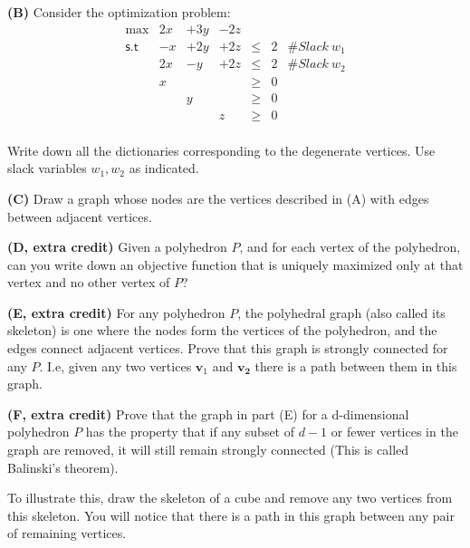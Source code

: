 \documentclass[11pt]{article}
\begin{document}
\noindent\textbf{(B)} Consider the optimization problem:
\[ \begin{array}{rcccccc}
\max & 2x & + 3y & - 2z \\
\mathsf{s.t} &  -x & + 2 y & + 2z & \leq & 2 & \# Slack\ w_1\\
& 2 x & - y & + 2z & \leq & 2 & \# Slack\ w_2\\
& x & & & \geq & 0\\
& & y& & \geq & 0 \\
& & & z & \geq & 0 \\
\end{array}\]

Write down all the dictionaries corresponding to the degenerate
vertices. Use slack variables $w_1, w_2$ as indicated.

\noindent\textbf{(C)} Draw a graph whose nodes are the vertices
described in (A) with edges between adjacent vertices. 

\medskip

\noindent\textbf{(D, extra credit)} Given a polyhedron $P$, and for
each vertex of the polyhedron,  can you  write down an
objective function that is uniquely maximized only at that vertex and
no other vertex of $P$? 


\medskip

\noindent\textbf{(E, extra credit)} For any polyhedron $P$, the
polyhedral graph (also called its skeleton) is one where the nodes
form the vertices of the polyhedron, and the edges connect adjacent
vertices. Prove that this graph is strongly connected for any
$P$. I.e, given any two vertices $\mathbf{v}_1$ and $\mathbf{v_2}$
there is a path between them in this graph.

\medskip

\noindent\textbf{(F, extra credit)}  Prove that the graph in part (E)
for a d-dimensional polyhedron $P$ has the property that if any subset
of $d-1$ or fewer vertices in the graph are removed, it will still
remain strongly connected (This is called Balinski's theorem).

To illustrate this, draw the skeleton of a cube and remove any two
vertices from this skeleton. You will notice that there is a path in
this graph between any pair of remaining vertices.
\end{document}
